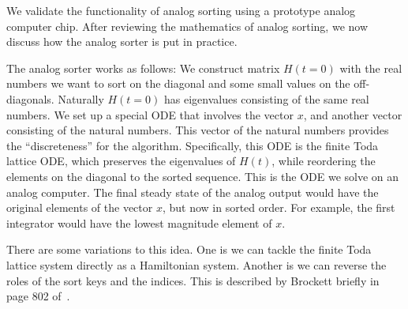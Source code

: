 We validate the functionality of analog sorting using a prototype analog computer chip.
After reviewing the mathematics of analog sorting, we now discuss how the analog sorter is put in practice.

The analog sorter works as follows:
We construct matrix $H(t=0)$ with the real numbers we want to sort on the diagonal and some small values on the off-diagonals.
Naturally $H(t=0)$ has eigenvalues consisting of the same real numbers.
We set up a special ODE that involves the vector $x$, and another vector consisting of the natural numbers.
This vector of the natural numbers provides the ``discreteness'' for the algorithm.
Specifically, this ODE is the finite Toda lattice ODE, which preserves the eigenvalues of $H(t)$, while reordering the elements on the diagonal to the sorted sequence.
This is the ODE we solve on an analog computer.
The final steady state of the analog output would have the original elements of the vector $x$, but now in sorted order.
For example, the first integrator would have the lowest magnitude element of $x$.



There are some variations to this idea.
One is we can tackle the finite Toda lattice system directly as a Hamiltonian system.
Another is we can reverse the roles of the sort keys and the indices.
This is described by Brockett briefly in page 802 of~\cite{brockett}.
